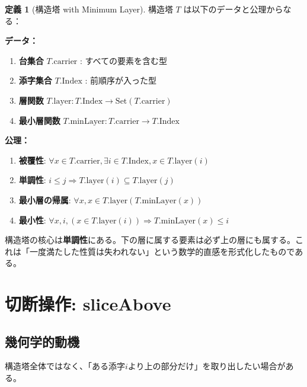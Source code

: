 \documentclass[a4paper,11pt]{article}
\theoremstyle{definition}
\newtheorem{definition}{定義}[section]
\begin{document}
\begin{definition}[構造塔 with Minimum Layer]
構造塔 $T$ は以下のデータと公理からなる：

\textbf{データ：}
\begin{enumerate}
    \item \textbf{台集合} $T.\text{carrier}$ : すべての要素を含む型
    \item \textbf{添字集合} $T.\text{Index}$ : 前順序が入った型
    \item \textbf{層関数} $T.\text{layer} : T.\text{Index} \to \text{Set}(T.\text{carrier})$
    \item \textbf{最小層関数} $T.\text{minLayer} : T.\text{carrier} \to T.\text{Index}$
\end{enumerate}

\textbf{公理：}
\begin{enumerate}
    \item \textbf{被覆性}: $\forall x \in T.\text{carrier}, \exists i \in T.\text{Index}, x \in T.\text{layer}(i)$
    \item \textbf{単調性}: $i \leq j \Rightarrow T.\text{layer}(i) \subseteq T.\text{layer}(j)$
    \item \textbf{最小層の帰属}: $\forall x, x \in T.\text{layer}(T.\text{minLayer}(x))$
    \item \textbf{最小性}: $\forall x, i, (x \in T.\text{layer}(i)) \Rightarrow T.\text{minLayer}(x) \leq i$
\end{enumerate}
\end{definition}

\begin{keyidea}
構造塔の核心は\textbf{単調性}にある。下の層に属する要素は必ず上の層にも属する。これは「一度満たした性質は失われない」という数学的直感を形式化したものである。
\end{keyidea}

\section{切断操作: sliceAbove}

\subsection{幾何学的動機}

構造塔全体ではなく、「ある添字$i$より上の部分だけ」を取り出したい場合がある。
\end{document}
